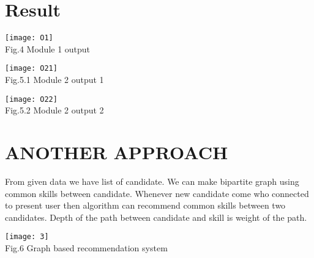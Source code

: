 \documentclass[journal, a4paper]{IEEEtran}
\begin{document}
\section{Result}
	\begin{center}
		\texttt{[image: O1]}\\
		\small Fig.4 Module 1 output
	\end{center}
	
	\begin{center}
		\texttt{[image: O21]}\\
		\small Fig.5.1 Module 2 output 1
	\end{center}

	\begin{center}
			\texttt{[image: O22]}\\
			\small Fig.5.2 Module 2 output 2
		\end{center}
\section{ANOTHER APPROACH}	
From given data we have list of candidate. We can make bipartite graph using common skills between candidate. Whenever new candidate come who connected to present user then algorithm can recommend common skills between two candidates. Depth of the path between candidate and skill is weight of the path.   

\begin{center}
	\texttt{[image: 3]}\\
	\small Fig.6 Graph based recommendation system
\end{center}
\end{document}
